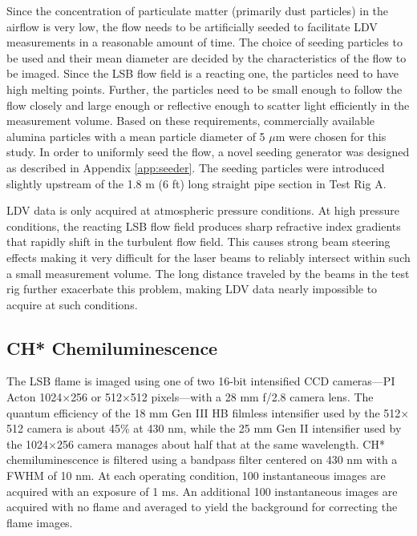 Since the concentration of particulate matter (primarily dust particles) in the airflow is very low, the flow needs to be artificially seeded to facilitate LDV measurements in a reasonable amount of time.
The choice of seeding particles to be used and their mean diameter are decided by the characteristics of the flow to be imaged.\cite{1997-melling}
Since the LSB flow field is a reacting one, the particles need to have high melting points.
Further, the particles need to be small enough to follow the flow closely and large enough or reflective enough to scatter light efficiently in the measurement volume.
Based on these requirements, commercially available alumina particles with a mean particle diameter of 5 \(\mu\)m were chosen for this study.
In order to uniformly seed the flow, a novel seeding generator was designed as described in Appendix \ref{app:seeder}.
The seeding particles were introduced slightly upstream of the 1.8 m (6 ft) long straight pipe section in Test Rig A.

LDV data is only acquired at atmospheric pressure conditions.
At high pressure conditions, the reacting LSB flow field produces sharp refractive index gradients that rapidly shift in the turbulent flow field.
This causes strong beam steering effects making it very difficult for the laser beams to reliably intersect within such a small measurement volume.\cite{1997-hemmerling}
The long distance traveled by the beams in the test rig further exacerbate this problem, making LDV data nearly impossible to acquire at such conditions.

\subsection{CH* Chemiluminescence}
\label{subsec:experimental-ch-chemiluminescence}

The LSB flame is imaged using one of two 16-bit intensified CCD cameras---PI Acton 1024\(\times\)256 or 512\(\times\)512 pixels---with a 28 mm f/2.8 camera lens.
The quantum efficiency of the 18 mm Gen III HB filmless intensifier used by the 512\(\times\)512 camera is about 45\% at 430 nm, while the 25 mm Gen II intensifier used by the 1024\(\times\)256 camera manages about half that at the same wavelength.
CH* chemiluminescence is filtered using a bandpass filter centered on 430 nm with a FWHM of 10 nm.
At each operating condition, 100 instantaneous images are acquired with an exposure of 1 ms.
An additional 100 instantaneous images are acquired with no flame and averaged to yield the background for correcting the flame images.

